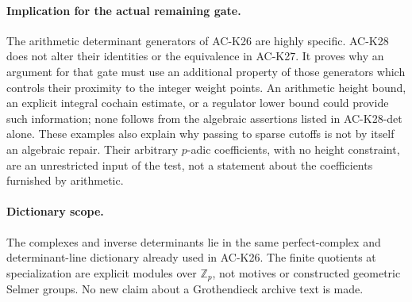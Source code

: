 \paragraph{Implication for the actual remaining gate.}
The arithmetic determinant generators of AC-K26 are highly
specific.  AC-K28 does not alter their identities or the
equivalence in AC-K27.  It proves why an argument for that
gate must use an additional property of those generators
which controls their proximity to the integer weight points.
An arithmetic height bound, an explicit integral cochain
estimate, or a regulator lower bound could provide such
information; none follows from the algebraic assertions
listed in AC-K28-det alone.  These examples also explain
why passing to sparse cutoffs is not by itself an algebraic
repair.  Their arbitrary $p$-adic coefficients, with no
height constraint, are an unrestricted input of the test,
not a statement about the coefficients furnished by arithmetic.

\paragraph{Dictionary scope.}
The complexes and inverse determinants lie in the same
perfect-complex and determinant-line dictionary already used
in AC-K26.  The finite quotients at specialization are
explicit modules over $\mathbb Z_p$, not motives or
constructed geometric Selmer groups.  No new claim about
a Grothendieck archive text is made.
